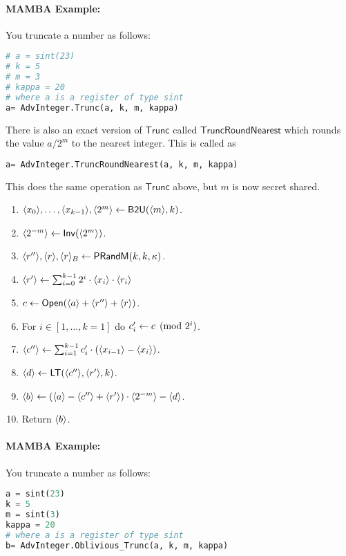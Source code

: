 \paragraph{MAMBA Example:} You truncate a number as follows: 
\begin{lstlisting}[language={python}]
# a = sint(23)
# k = 5
# m = 3 
# kappa = 20
# where a is a register of type sint
a= AdvInteger.Trunc(a, k, m, kappa)
\end{lstlisting}
There is also an exact version of $\mathsf{Trunc}$ called $\mathsf{TruncRoundNearest}$
which rounds the value $a/2^m$ to the nearest integer.
This is called as
\begin{lstlisting}[language={python}]
a= AdvInteger.TruncRoundNearest(a, k, m, kappa)
\end{lstlisting}


This does the same operation as $\mathsf{Trunc}$ above, but $m$ is now secret shared.
\begin{enumerate}
\item $\langle x_0 \rangle,\ldots,\langle x_{k-1} \rangle, \langle 2^m \rangle \leftarrow \mathsf{B2U}(\langle m \rangle,k)$.
\item $\langle 2^{-m} \rangle \leftarrow \mathsf{Inv}(\langle 2^m \rangle)$.
\item $\langle r'' \rangle, \langle r \rangle, \langle r \rangle_B \leftarrow \mathsf{PRandM}(k,k,\kappa)$.
\item $\langle r' \rangle \leftarrow \sum_{i=0}^{k-1} 2^i \cdot \langle x_i \rangle \cdot \langle r_i \rangle$
\item $c \leftarrow {\mathsf{Open}}(\langle a \rangle+\langle r'' \rangle+\langle r \rangle)$.
\item For $i \in [1,\ldots,k=1]$ do $c_i' \leftarrow c \pmod{2^i}$.
\item $\langle c'' \rangle \leftarrow \sum_{i=1}^{k-1} c_i' \cdot (\langle x_{i-1} \rangle-\langle x_i \rangle)$.
\item $\langle d \rangle \leftarrow \mathsf{LT}(\langle c'' \rangle,\langle r' \rangle,k)$.
\item $\langle b \rangle \leftarrow (\langle a \rangle-\langle c'' \rangle+\langle r' \rangle) \cdot \langle 2^{-m} \rangle - \langle d \rangle$.
\item Return $\langle b \rangle$.
\end{enumerate}

\paragraph{MAMBA Example:} You truncate a number as follows:
\begin{lstlisting}[language={python}]
a = sint(23)
k = 5
m = sint(3)
kappa = 20
# where a is a register of type sint
b= AdvInteger.Oblivious_Trunc(a, k, m, kappa)
\end{lstlisting}

